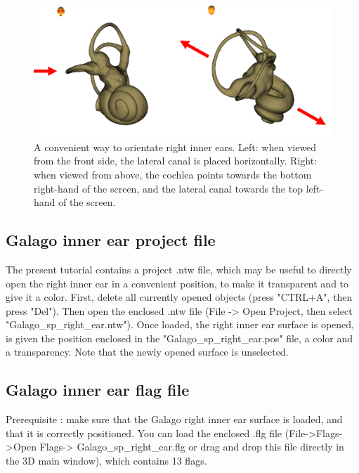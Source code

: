 \documentclass[12pt, a4paper]{book}
\begin{document}
\begin{figure}
  \centering
  \includegraphics[scale=0.3]{pos.png} 
	\caption{A convenient way to orientate right inner ears.  Left: when viewed from the front side, the lateral canal is placed horizontally. Right: when viewed from above, the cochlea points towards the bottom right-hand of the screen, and the lateral canal towards the top left-hand of the screen.}
\label{orientation}
 
\end{figure}

\subsection{Galago inner ear project file}
The present tutorial contains a project .ntw file, which may be useful to directly open the right inner ear
 in a convenient position, to make it transparent and to give it a color. First, delete all currently opened objects
(press "CTRL+A", then press "Del"). Then open the enclosed .ntw file (File -> Open Project, then select
"Galago\_sp\_right\_ear.ntw"). Once loaded, the right inner ear surface is opened, is given the position
enclosed in the "Galago\_sp\_right\_ear.pos" file, a color and a transparency. Note that the newly opened
surface is unselected.\\


\subsection{Galago inner ear flag file}
Prerequisite : make sure that the Galago right inner ear surface is loaded, and that it is correctly positioned. 
You can load the enclosed .flg file (File->Flags->Open Flags-> Galago\_sp\_right\_ear.flg or drag and drop this file directly in the 3D main window), which contains 13 flags.   
\end{document}

